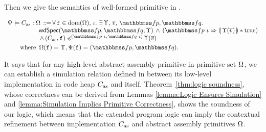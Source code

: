 Then we give the semantics of well-formed primitive in
\Def{\ref{def:wdprim-sem}}.
\begin{definition}
    \em
    \label{def:wdprim-sem}
    \small
    \[
        \begin{array}{l}
            \semWdPrim{\Cspec}{\asmimp}{\hprimset}
            \, \define \,
            \forall \, \lab{} \in \dom(\hprimset), \,
            \lgvl. \
            \exists \, \hprim, \, \args{\val}, \,
            \relspecpre, \relspecpost.  \\
            \hspace*{5em}
            \wdSpec{\relspecpre}{\relspecpost} {\hprim}
            	\, \land \,
            	(\relspecpre \ \lgvl \Rightarrow
            	\safePrimAst{\, \hprim(\args{\val}) \,}
                \sepstar \atrue) \\
            \hspace*{5em}
            \, \land \,
            \simFunction{(\asmimp, \lab{})}
                {(\relspecpre \ \lgvl, \,
                    \relspecpost \ \lgvl)}
                {\hprim(\args{\val})}
            \\
            \\[-9pt]
            \hspace*{2em}
            \TYPE{where } \,
            \hprimset(\lab{}) = \hprim,
            \Cspec(\lab{}) = (\relspecpre, \relspecpost).
        \end{array}
    \]
\end{definition}
It says that for any high-level
abstract assembly primitive
in primitive set $\Omega$,
we can establish a simulation relation
defined in \Def{\ref{def:simfunc}}
between its low-level implementation
in code heap $C_{\text{as}}$ and itself.
Theorem~\ref{thm:logic soundness},
whose correctness can be derived from Lemmas
\ref{lemma:Logic Ensures Simulation}
and \ref{lemma:Simulation Implies Primitive Correctness},
shows the soundness of our logic,
which means that the extended program logic can
imply the contextual refinement between implementation
$C_{\text{as}}$ and abstract assembly primitives $\Omega$.

